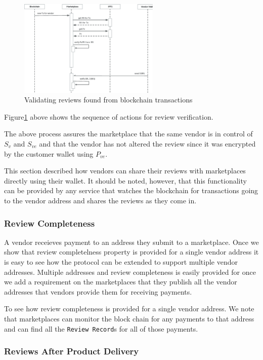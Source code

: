 \documentclass[a4paper]{article}
\begin{document}
\begin{figure}
\centering
\includegraphics[width=0.6\textwidth]{../validating-new-tx.eps}
\caption{\label{fig:validating-new-tx}Validating reviews found from blockchain transactions}
\end{figure}

Figure\ref{fig:validating-new-tx} above shows the sequence of actions
for review verification.

The above process assures the marketplace that the same vendor is in
control of $S_v$ and $S_{ve}$ and that the vendor has not altered the review
since it was encrypted by the customer wallet using $P_{ve}$.

This section described how vendors can share their reviews with
marketplaces directly using their wallet. It should be noted, however,
that this functionality can be provided by any service that watches
the blockchain for transactions going to the vendor address and shares
the reviews as they come in.

\subsubsection{Review Completeness}

A vendor receieves payment to an address they submit to a marketplace.
Once we show that review completelness property is provided for a
single vendor address it is easy to see how the protocol can be
extended to support multiple vendor addresses. Multiple addresses and
review completeness is easily provided for once we add a requirement
on the marketplaces that they publish all the vendor addresses that
vendors provide them for receiving payments.

To see how review completeness is provided for a single vendor
address. We note that marketplaces can monitor the block chain for any
payments to that address and can find all the \texttt{Review Record}s
for all of those payments.

\subsubsection{Reviews After Product Delivery}
\end{document}
